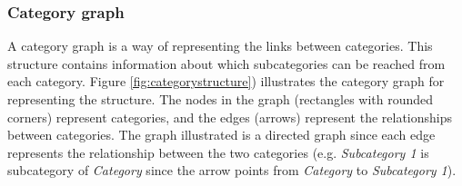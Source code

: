 \subsubsection{Category graph}
A category graph is a way of representing the links between categories. This structure contains information about which subcategories can be reached from each category. Figure \ref{fig:categorystructure}) illustrates the category graph for representing the structure. The nodes in the graph (rectangles with rounded corners) represent categories, and the edges (arrows) represent the relationships between categories. The graph illustrated is a directed graph since each edge represents the relationship between the two categories (e.g. \emph{Subcategory 1} is subcategory of \emph{Category} since the arrow points from \emph{Category} to \emph{Subcategory 1}).

